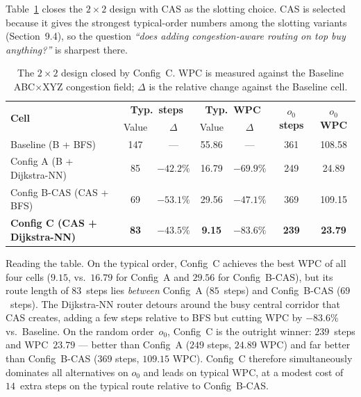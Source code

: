 \documentclass[12pt,a4paper]{article}
\begin{document}
Table~\ref{tab:config_c_2x2} closes the $2\times2$ design with CAS as
the slotting choice.
CAS is selected because it gives the strongest typical-order numbers
among the slotting variants (Section~9.4), so the question \emph{``does
adding congestion-aware routing on top buy anything?''} is sharpest there.

\begin{table}[H]
\centering
\caption{The $2\times2$ design closed by Config~C.
  WPC is measured against the Baseline ABC$\times$XYZ congestion field;
  $\Delta$ is the relative change against the Baseline cell.}
\label{tab:config_c_2x2}
\renewcommand{\arraystretch}{1.25}
\begin{tabular}{lcccccc}
\hline
\multirow{2}{*}{\textbf{Cell}} &
  \multicolumn{2}{c}{\textbf{Typ.\ steps}} &
  \multicolumn{2}{c}{\textbf{Typ.\ WPC}} &
  \multirow{2}{*}{\textbf{$o_0$ steps}} &
  \multirow{2}{*}{\textbf{$o_0$ WPC}} \\
 & Value & $\Delta$ & Value & $\Delta$ & & \\
\hline
Baseline (B + BFS)        & 147 & ---       & 55.86 & ---        & 361 & 108.58 \\
Config A (B + Dijkstra-NN) & 85 & $-42.2\%$ & 16.79 & $-69.9\%$ & 249 & 24.89 \\
Config B-CAS (CAS + BFS)   & 69 & $-53.1\%$ & 29.56 & $-47.1\%$ & 369 & 109.15 \\
\textbf{Config C (CAS + Dijkstra-NN)}
                           & \textbf{83} & $\bm{-43.5\%}$ & \textbf{9.15} & $\bm{-83.6\%}$
                           & \textbf{239} & \textbf{23.79} \\
\hline
\end{tabular}
\end{table}

Reading the table.
On the typical order, Config~C achieves the best WPC of all four cells
($9.15$, vs.\ $16.79$ for Config~A and $29.56$ for Config~B-CAS), but its
route length of $83$~steps lies \emph{between} Config~A ($85$~steps) and
Config~B-CAS ($69$~steps).
The Dijkstra-NN router detours around the busy central corridor that CAS
creates, adding a few steps relative to BFS but cutting WPC by $-83.6\%$
vs.\ Baseline.
On the random order~$o_0$, Config~C is the outright winner: $239$~steps
and WPC~$23.79$ --- better than Config~A ($249$ steps, $24.89$ WPC) and
far better than Config~B-CAS ($369$ steps, $109.15$ WPC).
Config~C therefore simultaneously dominates all alternatives on $o_0$ and
leads on typical WPC, at a modest cost of $14$~extra steps on the typical
route relative to Config~B-CAS.
\end{document}

